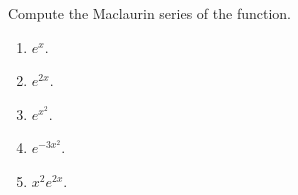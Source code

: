 Compute the Maclaurin series of the function.
\begin{multicols}{2}
\begin{enumerate}
\item $e^x$.
\item $e^{2x}$.
\item $e^{x^2}$.
\item $e^{-3x^2}$.
\item $x^2e^{2x}$.
\end{enumerate}
\end{multicols}